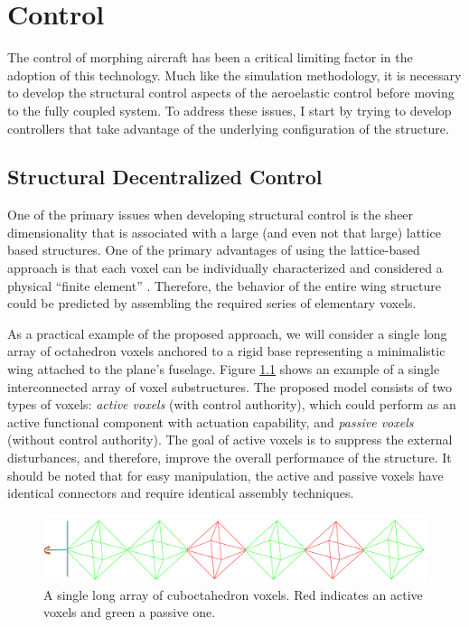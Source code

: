\documentclass[11pt]{ucthesis}
\begin{document}
\chapter{Control}
The control of morphing aircraft has been a critical limiting factor in the adoption of this technology. Much like the simulation methodology, it is necessary to develop the structural control aspects of the aeroelastic control before moving to the fully coupled system. To address these issues, I start by trying to develop controllers that take advantage of the underlying configuration of the structure.

\section{Structural Decentralized Control}
\label{sec:decentral}
One of the primary issues when developing structural control is the sheer dimensionality that is associated with a large (and even not that large) lattice based structures. One of the primary advantages of using the lattice-based approach is that each voxel can be individually characterized and considered a physical ``finite element'' \cite{calisch2014physical}. Therefore, the behavior of the entire wing structure could be predicted by assembling the required series of elementary voxels. 

As a practical example of the proposed approach, we will consider a single long array of octahedron voxels anchored to a rigid base representing a minimalistic wing attached to the plane's fuselage. Figure \ref{fig:interconnected} shows an example of a single interconnected array of voxel substructures. The proposed model consists of two types of voxels: {\it active voxels} (with control authority), which could perform as an active functional component with actuation capability,  and {\it passive voxels} (without control authority). The goal of active voxels is to suppress the external disturbances, and therefore, improve the overall performance of the structure. It should be noted that for easy manipulation, the active and passive voxels have identical connectors and require identical assembly techniques.  

\begin{figure}[thpb]
\centering
\includegraphics[width=0.75\linewidth]{Figures/exampleInterconnectedStructure.png}
\caption{A single long array of cuboctahedron voxels. Red indicates an active voxels and green a passive one.}
\label{fig:interconnected}
\end{figure}
\end{document}

